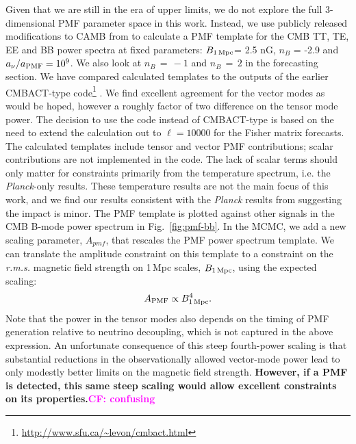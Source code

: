 \documentclass[apj]{emulateapj}
\newcommand{\apmf}{\ensuremath{A_{\rm PMF}}}
\newcommand{\bpmf}{\ensuremath{B_{\rm 1\,Mpc}}}
\newcommand{\be}{\begin{equation}}
\newcommand{\ee}{\end{equation}}
\newcommand{\planck}{{\sl Planck}}
\begin{document}
Given that we are still in the era of upper limits,  we do not explore the full 3-dimensional PMF parameter space in this work. 
Instead, we use publicly released modifications to CAMB from \citet{zucca16} to calculate a PMF template for the CMB TT, TE, EE and BB power spectra at fixed parameters: \bpmf = 2.5 \rm{nG}, $n_B$ = -2.9 and $a_{\nu}/a_{\rm{PMF}} = 10^9$. 
We also look at $n_B\,=\,-1$ and $n_B\,=\,2$ in the forecasting section. 
We have compared calculated templates to the outputs of the earlier CMBACT-type code\footnote{\url{http://www.sfu.ca/~levon/cmbact.html}} \citep{pogosian99}. 
We find excellent agreement  for the vector modes as would be hoped, however a roughly factor of two difference on the tensor mode power. 
The decision to use the  \citet{zucca16} code instead of CMBACT-type is based on the need to extend the calculation out to $\ell=10000$ for the Fisher matrix forecasts. 
The calculated templates include tensor and vector PMF contributions; scalar contributions are not implemented in the code. 
The lack of scalar terms should only matter for constraints primarily from the temperature spectrum, i.e. the \planck-only results. 
These temperature results are not the main focus of this work, and we find our results consistent with the \planck{} results from \citet{planck15-19} suggesting the impact is minor. 
The PMF template is plotted against other signals in the CMB B-mode power spectrum in Fig.~\ref{fig:pmf-bb}. 
In the MCMC, we add a new scaling parameter, $A_{pmf}$, that rescales the PMF power spectrum template. 
We can translate the amplitude constraint on this template to a constraint on the \textit{r.m.s.} magnetic field strength on 1\,Mpc scales, \bpmf, using the expected scaling:
\be
\apmf \propto \bpmf^4.
\ee
Note that the power in the tensor modes also depends on the timing of PMF generation relative to neutrino decoupling, which is not captured in the above expression. 
An unfortunate consequence of this steep fourth-power scaling is that substantial reductions in the observationally allowed vector-mode power lead to only modestly better limits on the magnetic field strength. 
\textbf{However, if a PMF is detected, this same steep scaling would allow excellent constraints on its properties.}\textbf{\textcolor{magenta}{CF: confusing}}
\end{document}
